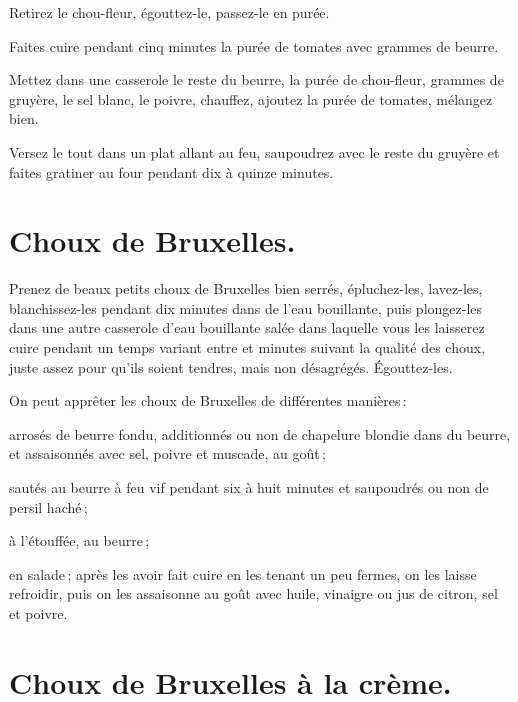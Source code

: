 Retirez le chou-fleur, égouttez-le, passez-le en purée.

Faites cuire pendant cinq minutes la purée de tomates avec {\mmm} grammes
de beurre.

Mettez dans une casserole le reste du beurre, la purée de chou-fleur,
{\mmm} grammes de gruyère, le sel blanc, le poivre, chauffez, ajoutez la
purée de tomates, mélangez bien.

Versez le tout dans un plat allant au feu, saupoudrez avec le reste du gruyère et
faites gratiner au four pendant dix à quinze minutes.

\section*{\centering Choux de Bruxelles.}
{}

Prenez de beaux petits choux de Bruxelles bien serrés, épluchez-les, lavez-les,
blanchissez-les pendant dix minutes dans de l'eau bouillante, puis plongez-les
dans une autre casserole d'eau bouillante salée dans laquelle vous les
laisserez cuire pendant un temps variant entre {\mmm} et {\mmm}
minutes suivant la qualité des choux, juste assez pour qu'ils soient tendres,
mais non désagrégés. Égouttez-les.

\medskip

On peut apprêter les choux de Bruxelles de différentes manières :

arrosés de beurre fondu, additionnés ou non de chapelure blondie dans du
beurre, et assaisonnés avec sel, poivre et muscade, au goût ;

sautés au beurre à feu vif pendant six à huit minutes et saupoudrés ou non de
persil haché ;

à l’étouffée, au beurre ;

en salade ; après les avoir fait cuire en les tenant un peu fermes, on les
laisse refroidir, puis on les assaisonne au goût avec huile, vinaigre ou jus de
citron, sel et poivre.

\section*{\centering Choux de Bruxelles à la crème.}
{}

